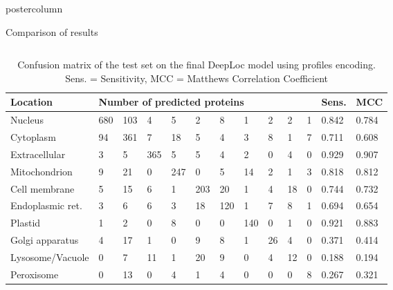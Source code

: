 \documentclass[final,hyperref={pdfpagelabels=false}]{beamer}
\begin{document}
\begin{frame}
\begin{columns}
\begin{column}{.49\paperwidth}
\begin{beamercolorbox}[center,wd=\textwidth]{postercolumn}
\begin{minipage}[T]{.99\textwidth}
{\begin{block}{Comparison of results}
\begin{columns}
\begin{column}{1\textwidth}
\centering

\centering
\begin{minipage}[t]{.95\textwidth}


\vspace{-1cm}
\begin{table}[h]
\small
\caption{Confusion matrix of the test set on the final DeepLoc model using profiles encoding. Sens. = Sensitivity, MCC = Matthews Correlation Coefficient}
\begin{tabular}{p{8cm}p{2cm}p{2cm}p{2cm}p{2cm}p{2cm}p{2cm}p{2cm}p{2cm}p{2cm}p{2cm}p{2.5cm}p{2.5cm}}
\toprule
Location      & \multicolumn{10}{l}{Number of predicted proteins}        & Sens. & MCC \\
\midrule
Nucleus          & 680 & 103 & 4   & 5   & 2   & 8   & 1   & 2  & 2 & 1 & 0.842 & 0.784 \\
Cytoplasm         & 94  & 361 &  7  & 18  & 5   & 4   & 3   & 8  & 1 & 7 & 0.711 & 0.608 \\
Extracellular    & 3   & 5   & 365 &  5  & 5   & 4   & 2   & 0  & 4 & 0 & 0.929 & 0.907 \\
Mitochondrion     & 9   & 21  & 0   & 247 &  0  & 5   & 14  & 2  & 1 & 3 & 0.818 & 0.812 \\
Cell membrane     & 5   & 15  & 6   & 1   & 203 & 20  & 1   & 4  & 18& 0 & 0.744 & 0.732 \\
Endoplasmic ret.               & 3   & 6   & 6   & 3   & 18  & 120 &  1  & 7  & 8 & 1 & 0.694 & 0.654 \\
Plastid           & 1   & 2   & 0   & 8   & 0   & 0   & 140 &  0 & 1 & 0 & 0.921 & 0.883 \\
Golgi apparatus  & 4   & 17  & 1   & 0   & 9   & 8   & 1   & 26 & 4 & 0 & 0.371 & 0.414 \\
Lysosome/Vacuole & 0   & 7   & 11  & 1   & 20  & 9   & 0   & 4  & 12& 0 & 0.188 & 0.194 \\
Peroxisome       & 0   & 13  & 0   & 4   & 1   & 4   & 0   & 0  & 0 & 8 & 0.267 & 0.321 \\
\bottomrule

\end{tabular}
\end{table}


\end{minipage}

\end{column}
\end{columns}
\end{block}

}
\end{minipage}
\end{beamercolorbox}
\end{column}
\end{columns}
\end{frame}
\end{document}

